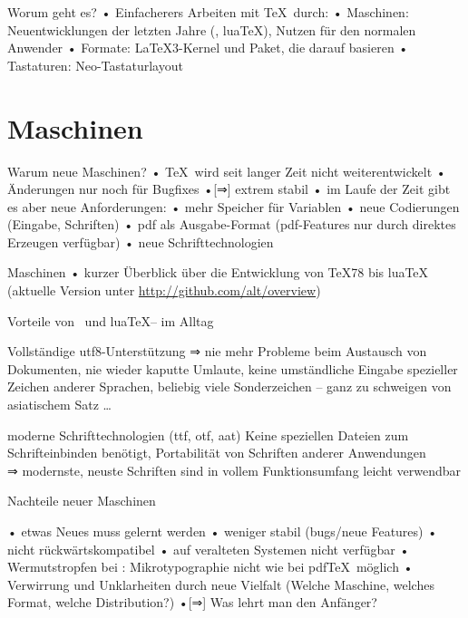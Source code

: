 \documentclass[t]{beamer}
\begin{document}
\begin{frame}{Worum geht es?}
• Einfacherers Arbeiten mit \TeX\ durch:
• Maschinen: Neuentwicklungen der letzten Jahre (\XeTeX, lua\TeX), Nutzen für den normalen Anwender
• Formate: \LaTeX3-Kernel und Paket, die darauf basieren
• Tastaturen: Neo-Tastaturlayout
\•
\end{frame}

\section{Maschinen}
\begin{frame}{Warum neue Maschinen?}
• \TeX\ wird seit langer Zeit nicht weiterentwickelt
• Änderungen nur noch für Bugfixes
•[⇒] extrem stabil\pause
• im Laufe der Zeit gibt es aber neue Anforderungen:
• mehr Speicher für Variablen
• neue Codierungen (Eingabe, Schriften)
• pdf als Ausgabe-Format (pdf-Features nur durch direktes Erzeugen verfügbar)
• neue Schrifttechnologien
\•
\end{frame}


\begin{frame}{Maschinen}
• kurzer Überblick über die Entwicklung von \TeX78 bis lua\TeX\\
(aktuelle Version unter \url{http://github.com/alt/overview})
\•
\end{frame}

\begin{frame}{Vorteile von \XeTeX\ und lua\TeX – im Alltag}
\begin{block}{Vollständige utf8-Unterstützung}
⇒ nie mehr Probleme beim Austausch von Dokumenten, nie wieder kaputte Umlaute, keine umständliche Eingabe spezieller Zeichen anderer Sprachen, beliebig viele Sonderzeichen – ganz zu schweigen von asiatischem Satz …
\end{block}
\pause

\begin{block}{moderne Schrifttechnologien (ttf, otf, aat)}
Keine speziellen Dateien zum Schrifteinbinden benötigt, Portabilität von Schriften anderer Anwendungen\\
⇒ modernste, neuste Schriften sind in vollem Funktionsumfang leicht verwendbar
\end{block}
\end{frame}

\begin{frame}{Nachteile neuer Maschinen}
\begin{block}{}
• etwas Neues muss gelernt werden
• weniger stabil (bugs/neue Features)
• nicht rückwärtskompatibel
• auf veralteten Systemen nicht verfügbar
• Wermutstropfen bei \XeTeX: Mikrotypographie nicht wie bei pdf\TeX\ möglich
• Verwirrung und Unklarheiten durch neue Vielfalt (Welche Maschine, welches Format, welche Distribution?)\pause
•[⇒] Was lehrt man den Anfänger?
\•
\end{block}
\end{frame}
\end{document}
